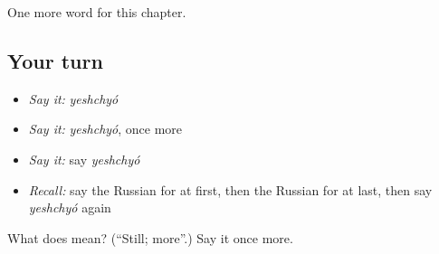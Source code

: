 \begin{grammarlens}[title={What you've built}]
One more word for this chapter.
\end{grammarlens}

\subsection*{Your turn}
\begin{itemize}
\raggedright
  \item \emph{Say it:} \emph{yeshchyó}
  \item \emph{Say it:} \emph{yeshchyó}, once more
  \item \emph{Say it:} say \emph{yeshchyó}
  \item \emph{Recall:} say the Russian for at first, then the Russian for at last, then say \emph{yeshchyó} again
\end{itemize}

\begin{tcolorbox}[breakable,colback=teal!4,colframe=teal!35!black,title={Before you move on}]
What does  mean? (\textquotedblleft{}Still; more\textquotedblright{}.) Say it once more.
\end{tcolorbox}
